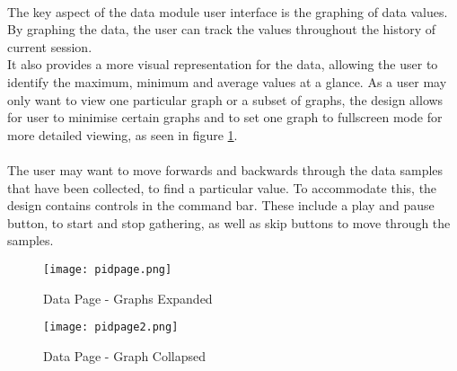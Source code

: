 		\paragraph{}{
		The key aspect of the data module user interface is the graphing of data values. By graphing the data, the user can track the values throughout the history of current session. 
\\		
		It also provides a more visual representation for the data, allowing the user to identify the maximum, minimum and average values at a glance. As a user may only want to view one particular graph or a subset of graphs, the design allows for user to minimise certain graphs and to set one graph to fullscreen mode for more detailed viewing, as seen in figure \ref{fig:DataPage2}.
		}
		\paragraph{}{
		The user may want to move forwards and backwards through the data samples that have been collected, to find a particular value. To accommodate this, the design contains controls in the command bar. These include a play and pause button, to start and stop gathering, as well as skip buttons to move through the samples.
		}
		\begin{figure}[h]
			\begin{center}								
				\begin{minipage}{0.49\textwidth}
					\texttt{[image: pidpage.png]}
					\caption{Data Page - Graphs Expanded}						
					\label{fig:DataPage1}
				\end{minipage}
				\hfill			
				\begin{minipage}{0.49\textwidth}
					\texttt{[image: pidpage2.png]}
					\caption{Data Page - Graph Collapsed}						
					\label{fig:DataPage2}
				\end{minipage}									
			\end{center}
		\end{figure}
	
	\newpage
